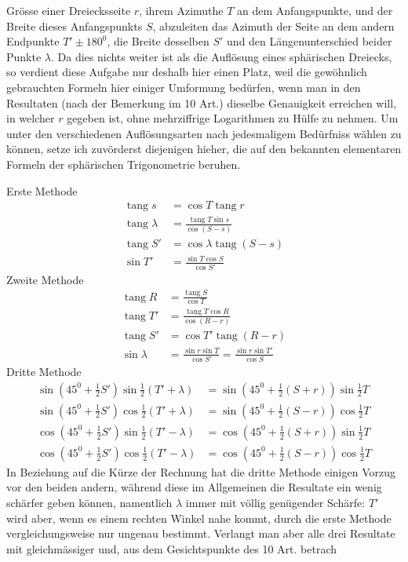 %
Grösse einer Dreiecksseite \(r\), ihrem Azimuthe \(T\) an dem Anfangspunkte, und der Breite dieses Anfangspunkts \(S\), abzuleiten das Azimuth der Seite an dem andern Endpunkte \(T'\pm180^0\), die Breite desselben \(S'\) und den Längenunterschied beider Punkte \(\lambda\). Da dies nichts weiter ist als die Auflösung eines sphärischen Dreiecks, so verdient diese Aufgabe nur deshalb hier einen Platz, weil die gewöhnlich gebrauchten Formeln hier einiger Umformung bedürfen, wenn man in den Resultaten (nach der Bemerkung im 10 Art.) dieselbe Genauigkeit erreichen will, in welcher \(r\) gegeben ist, ohne mehrziffrige Logarithmen zu Hülfe zu nehmen. Um unter den verschiedenen Auflösungsarten nach jedesmaligem Bedürfniss wählen zu können, setze ich zuvörderst diejenigen hieher, die auf den bekannten elementaren Formeln der sphärischen Trigonometrie beruhen.

Erste Methode
\[
\begin{aligned}
\operatorname{tang}s&=\cos T\operatorname{tang}r\\
\operatorname{tang}\lambda&=\frac{\operatorname{tang}T\sin s}{\cos(S-s)}\\
\operatorname{tang}S'&=\cos\lambda\operatorname{tang}(S-s)\\
\sin T'&=\frac{\sin T\cos S}{\cos S'}
\end{aligned}
\]
\indent Zweite Methode
\[
\begin{aligned}
\operatorname{tang}R&=\frac{\operatorname{tang}S}{\cos T}\\
\operatorname{tang}T'&=\frac{\operatorname{tang}T\cos R}{\cos(R-r)}\\
\operatorname{tang}S'&=\cos T'\operatorname{tang}(R-r)\\
\sin\lambda&=\frac{\sin r\sin T}{\cos S'}=\frac{\sin r\sin T'}{\cos S}
\end{aligned}
\]
\indent Dritte Methode
\[
\begin{aligned}
\sin(45^0+\tfrac{1}{2}S')\sin\tfrac{1}{2}(T'+\lambda)&=\sin(45^0+\tfrac{1}{2}(S+r))\sin\tfrac{1}{2}T\\
\sin(45^0+\tfrac{1}{2}S')\cos\tfrac{1}{2}(T'+\lambda)&=\sin(45^0+\tfrac{1}{2}(S-r))\cos\tfrac{1}{2}T\\
\cos(45^0+\tfrac{1}{2}S')\sin\tfrac{1}{2}(T'-\lambda)&=\cos(45^0+\tfrac{1}{2}(S+r))\sin\tfrac{1}{2}T\\
\cos(45^0+\tfrac{1}{2}S')\cos\tfrac{1}{2}(T'-\lambda)&=\cos(45^0+\tfrac{1}{2}(S-r))\cos\tfrac{1}{2}T
\end{aligned}
\]
\indent In Beziehung auf die Kürze der Rechnung hat die dritte Methode einigen Vorzug vor den beiden andern, während diese im Allgemeinen die Resultate ein wenig schärfer geben können, namentlich \(\lambda\) immer mit völlig genügender Schärfe: \(T'\) wird aber, wenn es einem rechten Winkel nahe kommt, durch die erste Methode vergleichungsweise nur ungenau bestimmt. Verlangt man aber alle drei Resultate mit gleichmässiger und, aus dem Gesichtspunkte des 10 Art. betrach%
